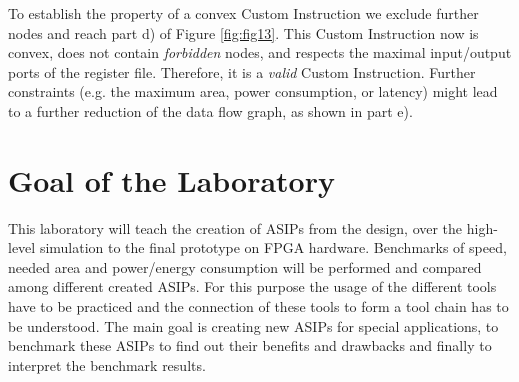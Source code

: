 To establish the property of a convex Custom Instruction we exclude
further nodes and reach part d) of Figure \ref{fig:fig13}. This Custom Instruction now is
convex, does not contain \emph{forbidden} nodes, and respects the
maximal input/output ports of the register file. Therefore, it is a
\emph{valid} Custom Instruction. Further constraints (e.g. the maximum
area, power consumption, or latency) might lead to a further reduction
of the data flow graph, as shown in part e).
\hypertarget{goal-of-the-laboratory}{%
\section{Goal of the Laboratory}\label{goal-of-the-laboratory}}
This laboratory will teach the creation of ASIPs from the design, over
the high-level simulation to the final prototype on FPGA hardware.
Benchmarks of speed, needed area and power/energy consumption will be
performed and compared among different created ASIPs. For this purpose
the usage of the different tools have to be practiced and the connection
of these tools to form a tool chain has to be understood. The main goal
is creating new ASIPs for special applications, to benchmark these ASIPs
to find out their benefits and drawbacks and finally to interpret the
benchmark results.

